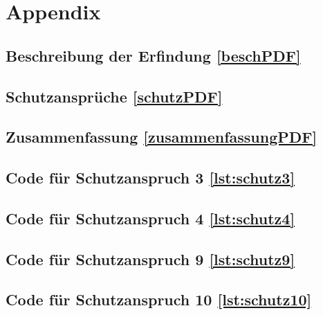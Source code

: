 \appendix
\chapter{Appendix}
\section*{Beschreibung der Erfindung \ref{beschPDF}}
\section*{Schutzansprüche \ref{schutzPDF}}
\section*{Zusammenfassung \ref{zusammenfassungPDF}}
\section*{Code für Schutzanspruch 3 \ref{lst:schutz3}}
\section*{Code für Schutzanspruch 4 \ref{lst:schutz4}}
\section*{Code für Schutzanspruch 9 \ref{lst:schutz9}}
\section*{Code für Schutzanspruch 10 \ref{lst:schutz10}}
\pagestyle{plain}
\centering
{}
\label{beschPDF} 

{}
\label{schutzPDF} 


{}
\label{zusammenfassungPDF}  






